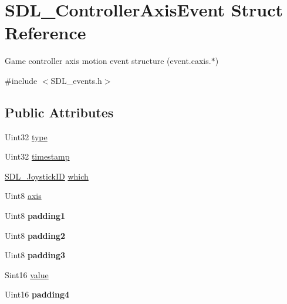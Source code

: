 \hypertarget{struct_s_d_l___controller_axis_event}{}\section{S\+D\+L\+\_\+\+Controller\+Axis\+Event Struct Reference}
\label{struct_s_d_l___controller_axis_event}


Game controller axis motion event structure (event.\+caxis.$\ast$)  




{\ttfamily \#include $<$S\+D\+L\+\_\+events.\+h$>$}

\subsection*{Public Attributes}
\begin{DoxyCompactItemize}
\item 
Uint32 \mbox{\hyperlink{struct_s_d_l___controller_axis_event_aa904b61e4763d28d887cf8afcc3cbb7c}{type}}
\item 
Uint32 \mbox{\hyperlink{struct_s_d_l___controller_axis_event_afc92dba0b4d1652a1ecf9e85606d1f14}{timestamp}}
\item 
\mbox{\hyperlink{_s_d_l__joystick_8h_a3c3d32500cb08f76ee8077983912c0bd}{S\+D\+L\+\_\+\+Joystick\+ID}} \mbox{\hyperlink{struct_s_d_l___controller_axis_event_a07087f68ea9d64b50047d65312ee7b94}{which}}
\item 
Uint8 \mbox{\hyperlink{struct_s_d_l___controller_axis_event_aba6543c143521aebce06a41a8cf79db0}{axis}}
\item 
\mbox{\label{struct_s_d_l___controller_axis_event_af980495b1e24f9a868f2ccb25ce9629b}} 
Uint8 {\bfseries padding1}
\item 
\mbox{\label{struct_s_d_l___controller_axis_event_a4a04fcd20a54db21c5258ab0e40c6ab5}} 
Uint8 {\bfseries padding2}
\item 
\mbox{\label{struct_s_d_l___controller_axis_event_ab82598fe5621dca9b1a41f7b2ca1e9a0}} 
Uint8 {\bfseries padding3}
\item 
Sint16 \mbox{\hyperlink{struct_s_d_l___controller_axis_event_a1ed7f14255ed01b982d40a38791d475a}{value}}
\item 
\mbox{\label{struct_s_d_l___controller_axis_event_ae0ad0f279b9978bbbac9f5b22ae8020b}} 
Uint16 {\bfseries padding4}
\end{DoxyCompactItemize}



